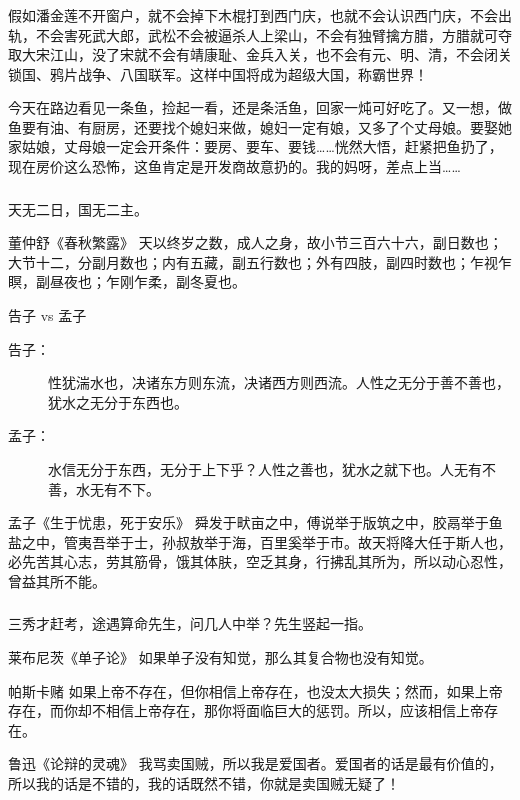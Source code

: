 \documentclass[UTF8,11pt,colorlinks,compress,openany]{beamer}%
\begin{document}
\begin{frame}\frametitle{}
\begin{block}{}
假如潘金莲不开窗户，就不会掉下木棍打到西门庆，也就不会认识西门庆，不会出轨，不会害死武大郎，武松不会被逼杀人上梁山，不会有独臂擒方腊，方腊就可夺取大宋江山，没了宋就不会有靖康耻、金兵入关，也不会有元、明、清，不会闭关锁国、鸦片战争、八国联军。这样中国将成为超级大国，称霸世界！
\end{block}
\begin{block}{}
今天在路边看见一条鱼，捡起一看，还是条活鱼，回家一炖可好吃了。又一想，做鱼要有油、有厨房，还要找个媳妇来做，媳妇一定有娘，又多了个丈母娘。要娶她家姑娘，丈母娘一定会开条件：要房、要车、要钱……恍然大悟，赶紧把鱼扔了，现在房价这么恐怖，这鱼肯定是开发商故意扔的。我的妈呀，差点上当……
\end{block}
\end{frame}

\begin{frame}\frametitle{}
\begin{block}{}
天无二日，国无二主。
\end{block}
\begin{block}{董仲舒《春秋繁露》}
天以终岁之数，成人之身，故小节三百六十六，副日数也；大节十二，分副月数也；内有五藏，副五行数也；外有四肢，副四时数也；乍视乍瞑，副昼夜也；乍刚乍柔，副冬夏也。
\end{block}
\begin{block}{告子 vs 孟子}
\begin{description}
\item[告子：] 性犹湍水也，决诸东方则东流，决诸西方则西流。人性之无分于善不善也，犹水之无分于东西也。
\item[孟子：] 水信无分于东西，无分于上下乎？人性之善也，犹水之就下也。人无有不善，水无有不下。
\end{description}
\end{block}
\begin{block}{孟子《生于忧患，死于安乐》}
舜发于畎亩之中，傅说举于版筑之中，胶鬲举于鱼盐之中，管夷吾举于士，孙叔敖举于海，百里奚举于市。故天将降大任于斯人也，必先苦其心志，劳其筋骨，饿其体肤，空乏其身，行拂乱其所为，所以动心忍性，曾益其所不能。
\end{block}
\end{frame}

\begin{frame}\frametitle{}
\begin{block}{}
	三秀才赶考，途遇算命先生，问几人中举？先生竖起一指。
\end{block}
\begin{block}{莱布尼茨《单子论》}
	如果单子没有知觉，那么其复合物也没有知觉。
\end{block}
\begin{block}{帕斯卡赌}
	如果上帝不存在，但你相信上帝存在，也没太大损失；然而，如果上帝存在，而你却不相信上帝存在，那你将面临巨大的惩罚。所以，应该相信上帝存在。
\end{block}
\begin{block}{鲁迅《论辩的灵魂》}
	我骂卖国贼，所以我是爱国者。爱国者的话是最有价值的，所以我的话是不错的，我的话既然不错，你就是卖国贼无疑了！
\end{block}
\end{frame}
\end{document}
